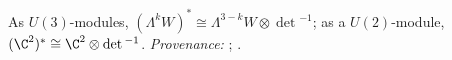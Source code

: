 As $U(3)$-modules, $(\Lambda^{k}W)^{*} \cong \Lambda^{3-k}W \otimes \det{}^{-1}$; as a $U(2)$-module, $(\C^{2})^{*} \cong \C^{2} \otimes \det{}^{-1}$. \emph{Provenance:} \cite[Fact~2.6]{ButlerT12}; \cite[\S 6.1, \S 15.3]{FultonHarris1991}.
